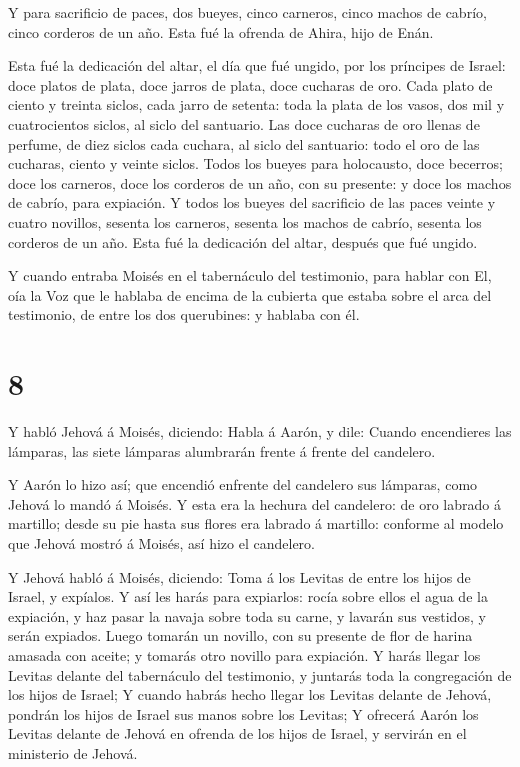  Y para sacrificio de paces, dos bueyes, cinco carneros,
cinco machos de cabrío, cinco corderos de un año. Esta fué la ofrenda de
Ahira, hijo de Enán.

 Esta fué la dedicación del altar, el día que fué ungido,
por los príncipes de Israel: doce platos de plata, doce jarros de plata,
doce cucharas de oro.  Cada plato de ciento y treinta
siclos, cada jarro de setenta: toda la plata de los vasos, dos mil y
cuatrocientos siclos, al siclo del santuario.  Las doce
cucharas de oro llenas de perfume, de diez siclos cada cuchara, al siclo
del santuario: todo el oro de las cucharas, ciento y veinte siclos.
 Todos los bueyes para holocausto, doce becerros; doce los
carneros, doce los corderos de un año, con su presente: y doce los
machos de cabrío, para expiación.  Y todos los bueyes del
sacrificio de las paces veinte y cuatro novillos, sesenta los carneros,
sesenta los machos de cabrío, sesenta los corderos de un año. Esta fué
la dedicación del altar, después que fué ungido.

 Y cuando entraba Moisés en el tabernáculo del testimonio,
para hablar con El, oía la Voz que le hablaba de encima de la cubierta
que estaba sobre el arca del testimonio, de entre los dos querubines: y
hablaba con él.

\hypertarget{section-7}{%
\section{8}\label{section-7}}

 Y habló Jehová á Moisés, diciendo:  Habla á
Aarón, y dile: Cuando encendieres las lámparas, las siete lámparas
alumbrarán frente á frente del candelero.

 Y Aarón lo hizo así; que encendió enfrente del candelero
sus lámparas, como Jehová lo mandó á Moisés.  Y esta era la
hechura del candelero: de oro labrado á martillo; desde su pie hasta sus
flores era labrado á martillo: conforme al modelo que Jehová mostró á
Moisés, así hizo el candelero.

 Y Jehová habló á Moisés, diciendo:  Toma á los
Levitas de entre los hijos de Israel, y expíalos.  Y así les
harás para expiarlos: rocía sobre ellos el agua de la expiación, y haz
pasar la navaja sobre toda su carne, y lavarán sus vestidos, y serán
expiados.  Luego tomarán un novillo, con su presente de flor
de harina amasada con aceite; y tomarás otro novillo para expiación.
 Y harás llegar los Levitas delante del tabernáculo del
testimonio, y juntarás toda la congregación de los hijos de Israel;
 Y cuando habrás hecho llegar los Levitas delante de
Jehová, pondrán los hijos de Israel sus manos sobre los Levitas;
 Y ofrecerá Aarón los Levitas delante de Jehová en ofrenda
de los hijos de Israel, y servirán en el ministerio de Jehová.


